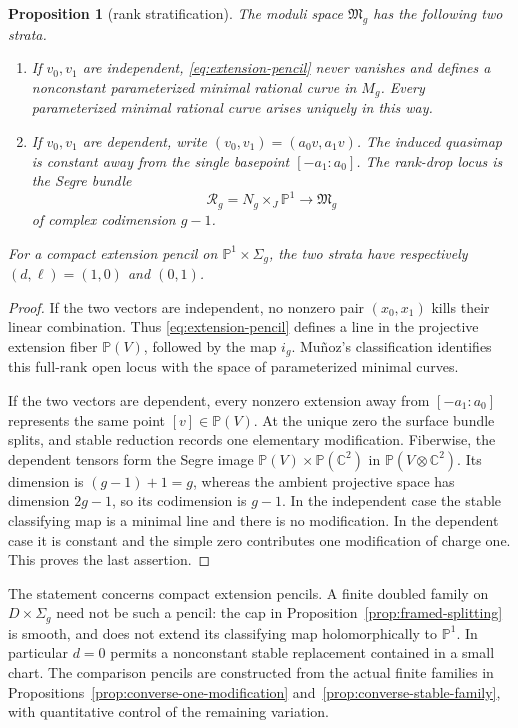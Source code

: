 \documentclass[11pt]{amsart}
\newtheorem{proposition}[theorem]{Proposition}
\theoremstyle{definition}
\theoremstyle{remark}
\theoremstyle{plain}
\newcommand{\CC}{\mathbb{C}}
\newcommand{\PP}{\mathbb{P}}
\newcommand{\cR}{\mathcal{R}}
\newcommand{\frakM}{\mathfrak{M}}
\begin{document}
\begin{proposition}[rank stratification]\label{prop:rank-strata}
The moduli space $\frakM_g$ has the following two strata.
\begin{enumerate}
\item If $v_0,v_1$ are independent, \eqref{eq:extension-pencil} never
vanishes and defines a nonconstant parameterized minimal rational curve in
$M_g$.  Every parameterized minimal rational curve arises uniquely in
this way.
\item If $v_0,v_1$ are dependent, write
$(v_0,v_1)=(a_0v,a_1v)$.  The induced quasimap is constant away from the
single basepoint $[-a_1:a_0]$.  The rank-drop locus is the Segre bundle
\begin{equation}\label{eq:Segre}
 \cR_g=N_g\times_J\PP^1\longrightarrow\frakM_g
\end{equation}
of complex codimension $g-1$.
\end{enumerate}
For a compact extension pencil on $\PP^1\times\Sigma_g$,
the two strata have respectively $(d,\ell)=(1,0)$ and $(0,1)$.
\end{proposition}

\begin{proof}
If the two vectors are independent, no nonzero pair $(x_0,x_1)$ kills
their linear combination.  Thus \eqref{eq:extension-pencil} defines a
line in the projective extension fiber $\PP(V)$, followed by the map
$i_g$.  Mu\~noz's classification identifies this full-rank open locus with
the space of parameterized minimal curves.

If the two vectors are dependent, every nonzero extension away from
$[-a_1:a_0]$ represents the same point $[v]\in\PP(V)$.  At the unique
zero the surface bundle splits, and stable reduction records one
elementary modification.  Fiberwise, the dependent tensors form the
Segre image $\PP(V)\times\PP(\CC^2)$ in
$\PP(V\otimes\CC^2)$.  Its dimension is $(g-1)+1=g$, whereas the ambient
projective space has dimension $2g-1$, so its codimension is $g-1$.
In the independent case the stable classifying map is a minimal
line and there is no modification. In the dependent case it is
constant and the simple zero contributes one modification of
charge one. This proves the last assertion.
\end{proof}

The statement concerns compact extension pencils. A finite doubled
family on $D\times\Sigma_g$ need not be such a pencil:
the cap in Proposition~\ref{prop:framed-splitting} is smooth,
and does not extend its classifying map holomorphically to
$\PP^1$. In particular $d=0$ permits a nonconstant stable
replacement contained in a small chart. The comparison pencils
are constructed from the actual finite families in
Propositions~\ref{prop:converse-one-modification}
and~\ref{prop:converse-stable-family}, with quantitative control
of the remaining variation.
\end{document}
